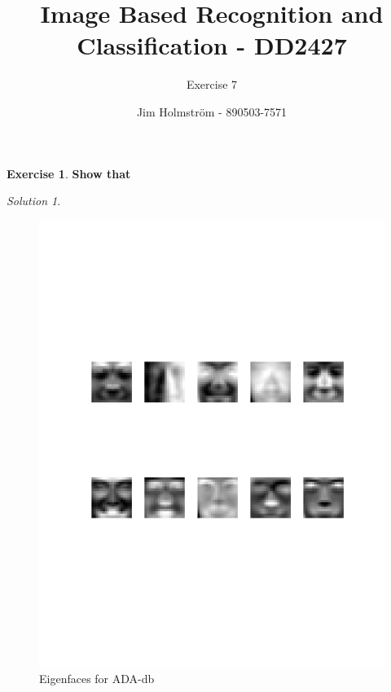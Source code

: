 \documentclass[a4paper,twoside=false,abstract=false,numbers=noenddot,
titlepage=false,headings=small,parskip=half,version=last]{scrartcl}
\author{Jim Holmström - 890503-7571}
\title{Image Based Recognition and Classification - DD2427}
\subtitle{Exercise 7}
\theoremstyle{definition}
\newtheorem{exercise}{Exercise}
\theoremstyle{remark}
\newtheorem*{solution}{Solution}
\begin{document}
\maketitle
\thispagestyle{empty}

\begin{exercise}
{\bf
Show that
}
\end{exercise}
\begin{solution}

\end{solution}

\pagebreak
\begin{figure}[t]
    \begin{center}
        \includegraphics[width=1.0\textwidth]{../Result_Pics/ADAFACES_eigen/ADA.pdf}
    \end{center}
    \caption{Eigenfaces for ADA-db}
    \label{fig:ADA}
\end{figure}
\end{document}
